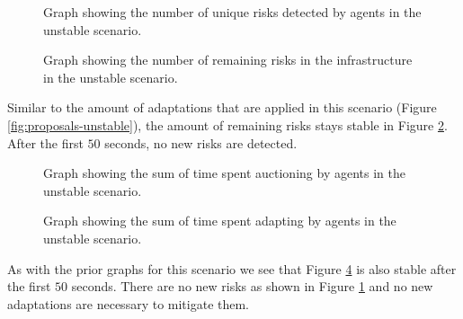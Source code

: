 \begin{figure}[H]
    \centering
        
    \caption{Graph showing the number of unique risks detected by agents in the unstable scenario.}
    \label{fig:risk-count-unstable}
\end{figure}

\begin{figure}[H]
    \centering
        
    \caption{Graph showing the number of remaining risks in the infrastructure in the unstable scenario.}
    \label{fig:risk-remaining-unstable}
\end{figure}

Similar to the amount of adaptations that are applied in this scenario (Figure \ref{fig:proposals-unstable}), the amount of remaining risks stays stable in Figure \ref{fig:risk-remaining-unstable}. After the first $50$ seconds, no new risks are detected.

\begin{figure}[H]
    \hspace*{-1.2cm}
    \centering
        
    \caption{Graph showing the sum of time spent auctioning by agents in the unstable scenario.}
    \label{fig:auctioning-time-unstable}
\end{figure}

\begin{figure}[H]
    \hspace*{-1.2cm}
    \centering
        
    \caption{Graph showing the sum of time spent adapting by agents in the unstable scenario.}
    \label{fig:adapting-time-unstable}
\end{figure}

As with the prior graphs for this scenario we see that Figure \ref{fig:adapting-time-unstable} is also stable after the first $50$ seconds. There are no new risks as shown in Figure \ref{fig:risk-count-unstable} and no new adaptations are necessary to mitigate them. 
